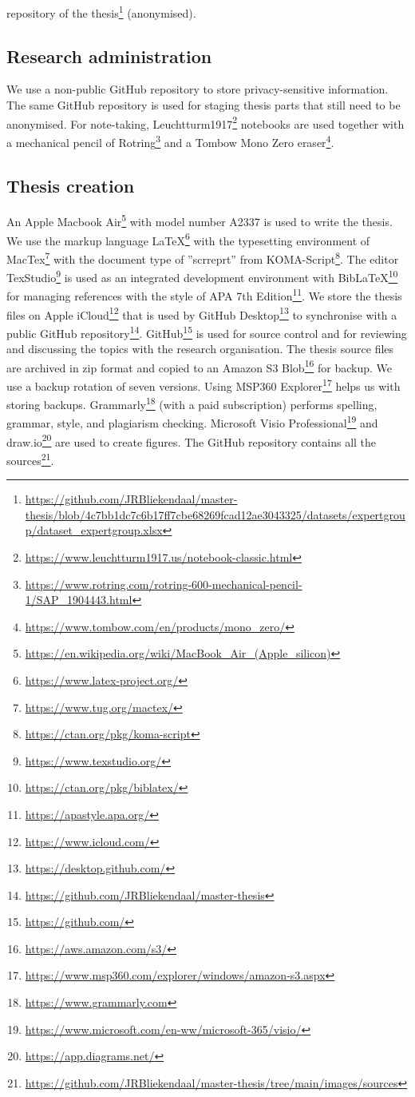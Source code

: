 repository of the thesis\footnote{\url{https://github.com/JRBliekendaal/master-thesis/blob/4c7bb1dc7c6b17ff7cbe68269fcad12ae3043325/datasets/expertgroup/dataset_expertgroup.xlsx}} (anonymised).
\subsection{Research administration}
\label{sub:tbresearchadministration}
We use a non-public GitHub repository to store privacy-sensitive information. The same GitHub repository is used for staging thesis parts that still need to be anonymised. For note-taking, Leuchtturm1917\footnote{\url{https://www.leuchtturm1917.us/notebook-classic.html}} notebooks are used together with a mechanical pencil of Rotring\footnote{\url{https://www.rotring.com/rotring-600-mechanical-pencil-1/SAP_1904443.html}} and a Tombow Mono Zero eraser\footnote{\url{https://www.tombow.com/en/products/mono_zero/}}.
\subsection{Thesis creation}
\label{subsub:tbresearchcreation}
An Apple Macbook Air\footnote{\url{https://en.wikipedia.org/wiki/MacBook_Air_(Apple_silicon)}} with model number A2337 is used to write the thesis. We use the markup language \LaTeX\footnote{\url{https://www.latex-project.org/}} with the typesetting environment of MacTex\footnote{\url{https://www.tug.org/mactex/}} with the document type of ''scrreprt'' from KOMA-Script\footnote{\url{https://ctan.org/pkg/koma-script}}. The editor TexStudio\footnote{\url{https://www.texstudio.org/}} is used as an integrated development environment with Bib\LaTeX\footnote{\url{https://ctan.org/pkg/biblatex/}} for managing references with the style of APA 7th Edition\footnote{\url{https://apastyle.apa.org/}}. We store the thesis files on Apple iCloud\footnote{\url{https://www.icloud.com/}} that is used by GitHub Desktop\footnote{\url{https://desktop.github.com/}} to synchronise with a public GitHub repository\footnote{\url{https://github.com/JRBliekendaal/master-thesis}}. GitHub\footnote{\url{https://github.com/}}  is used for source control and for reviewing and discussing the topics with the research organisation. The thesis source files are archived in zip format and copied to an Amazon S3 Blob\footnote{\url{https://aws.amazon.com/s3/}} for backup. We use a backup rotation of seven versions. Using MSP360 Explorer\footnote{\url{https://www.msp360.com/explorer/windows/amazon-s3.aspx}} helps us with storing backups. Grammarly\footnote{\url{https://www.grammarly.com}} (with a paid subscription) performs spelling, grammar, style, and plagiarism checking. Microsoft Visio Professional\footnote{\url{https://www.microsoft.com/en-ww/microsoft-365/visio/}} and draw.io\footnote{\url{https://app.diagrams.net/}} are used to create figures. The GitHub repository contains all the sources\footnote{\url{https://github.com/JRBliekendaal/master-thesis/tree/main/images/sources}}.